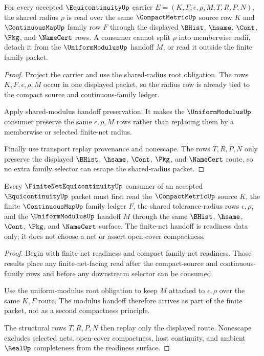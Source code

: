 \begin{theorem}
\label{thm:equicontinuity-shared-radius-family-nonescape}
For every accepted $\EquicontinuityUp$ carrier $E=(K,F,\epsilon,\rho,M,T,R,P,N)$, the shared radius $\rho$ is read over the same $\CompactMetricUp$ source row $K$ and $\ContinuousMapUp$ family row $F$ through the displayed $\BHist$, $\hsame$, $\Cont$, $\Pkg$, and $\NameCert$ rows. A consumer cannot split $\rho$ into memberwise radii, detach it from the $\UniformModulusUp$ handoff $M$, or read it outside the finite family packet.
\end{theorem}
\begin{proof}
Project the carrier and use the shared-radius root obligation. The rows $K,F,\epsilon,\rho,M$ occur in one displayed packet, so the radius row is already tied to the compact source and continuous-family ledger.

Apply shared-modulus handoff preservation. It makes the $\UniformModulusUp$ consumer preserve the same $\epsilon,\rho,M$ rows rather than replacing them by a memberwise or selected finite-net radius.

Finally use transport replay provenance and nonescape. The rows $T,R,P,N$ only preserve the displayed $\BHist$, $\hsame$, $\Cont$, $\Pkg$, and $\NameCert$ route, so no extra family selector can escape the shared-radius packet.
\end{proof}

\begin{theorem}
\label{thm:equicontinuity-compact-net-modulus-readiness}
Every $\FiniteNetEquicontinuityUp$ consumer of an accepted $\EquicontinuityUp$ packet must first read the $\CompactMetricUp$ source $K$, the finite $\ContinuousMapUp$ family ledger $F$, the shared tolerance-radius rows $\epsilon,\rho$, and the $\UniformModulusUp$ handoff $M$ through the same $\BHist$, $\hsame$, $\Cont$, $\Pkg$, and $\NameCert$ surface. The finite-net handoff is readiness data only; it does not choose a net or assert open-cover compactness.
\end{theorem}
\begin{proof}
Begin with finite-net readiness and compact family-net readiness. Those results place any finite-net-facing read after the compact-source and continuous-family rows and before any downstream selector can be consumed.

Use the uniform-modulus root obligation to keep $M$ attached to $\epsilon,\rho$ over the same $K,F$ route. The modulus handoff therefore arrives as part of the finite packet, not as a second compactness principle.

The structural rows $T,R,P,N$ then replay only the displayed route. Nonescape excludes selected nets, open-cover compactness, host continuity, and ambient $\RealUp$ completeness from the readiness surface.
\end{proof}

